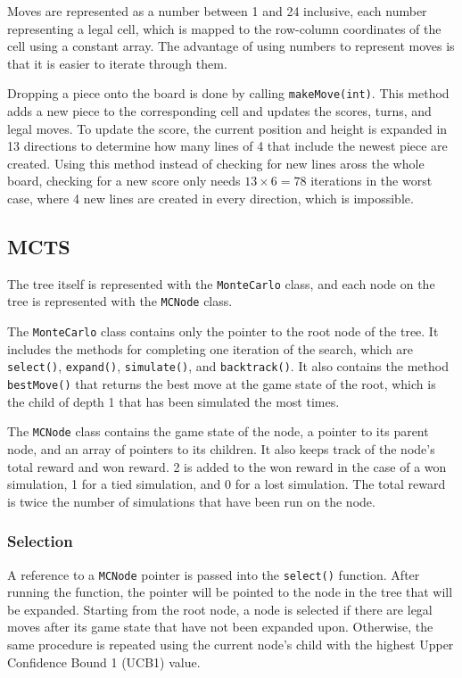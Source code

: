 \documentclass[12pt, a4paper]{article}
\begin{document}
    Moves are represented as a number between 1 and 24 inclusive, each number representing a legal cell, which is mapped to the row-column coordinates of the cell using a constant array. The advantage of using numbers to represent moves is that it is easier to iterate through them. 

    Dropping a piece onto the board is done by calling {\tt makeMove(int)}. This method adds a new piece to the corresponding cell and updates the scores, turns, and legal moves. To update the score, the current position and height is expanded in 13 directions to determine how many lines of 4 that include the newest piece are created. Using this method instead of checking for new lines aross the whole board, checking for a new score only needs $13\times6=78$ iterations in the worst case, where 4 new lines are created in every direction, which is impossible.

    \subsection{MCTS}

    The tree itself is represented with the {\tt MonteCarlo} class, and each node on the tree is represented with the {\tt MCNode} class.

    The {\tt MonteCarlo} class contains only the pointer to the root node of the tree. It includes the methods for completing one iteration of the search, which are {\tt select()}, {\tt expand()}, {\tt simulate()}, and {\tt backtrack()}. It also contains the method {\tt bestMove()} that returns the best move at the game state of the root, which is the child of depth 1 that has been simulated the most times. 

    The {\tt MCNode} class contains the game state of the node, a pointer to its parent node, and an array of pointers to its children. It also keeps track of the node's total reward and won reward. 2 is added to the won reward in the case of a won simulation, 1 for a tied simulation, and 0 for a lost simulation. The total reward is twice the number of simulations that have been run on the node.

    \subsubsection{Selection}

    A reference to a {\tt MCNode} pointer is passed into the {\tt select()} function. After running the function, the pointer will be pointed to the node in the tree that will be expanded. Starting from the root node, a node is selected if there are legal moves after its game state that have not been expanded upon. Otherwise, the same procedure is repeated using the current node's child with the highest Upper Confidence Bound 1 (UCB1) value. 
    
\end{document}
